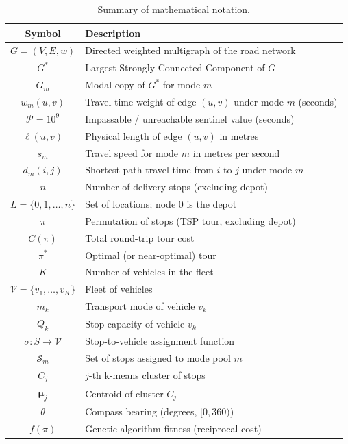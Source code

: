 \documentclass[12pt, a4paper]{article}
\theoremstyle{definition}
\begin{document}
\begin{table}[h]
  \centering
  \caption{Summary of mathematical notation.}
  \begin{tabular}{cl}
    \toprule
    Symbol & Description \\
    \midrule
    $G = (V, E, w)$ & Directed weighted multigraph of the road network \\
    $G^*$ & Largest Strongly Connected Component of $G$ \\
    $G_m$ & Modal copy of $G^*$ for mode $m$ \\
    $w_m(u, v)$ & Travel-time weight of edge $(u, v)$ under mode $m$ (seconds) \\
    $\mathcal{P} = 10^9$ & Impassable / unreachable sentinel value (seconds) \\
    $\ell(u, v)$ & Physical length of edge $(u, v)$ in metres \\
    $s_m$ & Travel speed for mode $m$ in metres per second \\
    $d_m(i, j)$ & Shortest-path travel time from $i$ to $j$ under mode $m$ \\
    $n$ & Number of delivery stops (excluding depot) \\
    $L = \{0, 1, \ldots, n\}$ & Set of locations; node $0$ is the depot \\
    $\pi$ & Permutation of stops (TSP tour, excluding depot) \\
    $C(\pi)$ & Total round-trip tour cost \\
    $\pi^*$ & Optimal (or near-optimal) tour \\
    $K$ & Number of vehicles in the fleet \\
    $\mathcal{V} = \{v_1, \ldots, v_K\}$ & Fleet of vehicles \\
    $m_k$ & Transport mode of vehicle $v_k$ \\
    $Q_k$ & Stop capacity of vehicle $v_k$ \\
    $\sigma : S \to \mathcal{V}$ & Stop-to-vehicle assignment function \\
    $\mathcal{S}_m$ & Set of stops assigned to mode pool $m$ \\
    $C_j$ & $j$-th k-means cluster of stops \\
    $\boldsymbol{\mu}_j$ & Centroid of cluster $C_j$ \\
    $\theta$ & Compass bearing (degrees, $[0, 360)$) \\
    $f(\pi)$ & Genetic algorithm fitness (reciprocal cost) \\
    \bottomrule
  \end{tabular}
\end{table}
\end{document}
